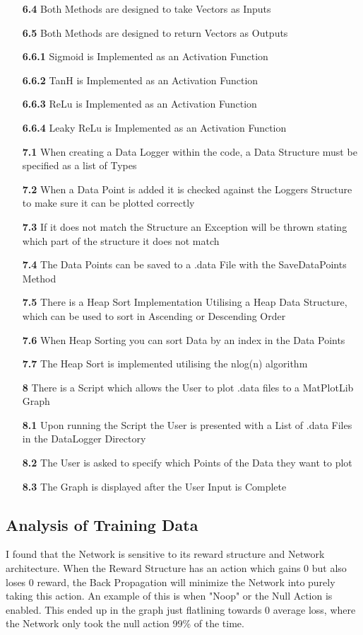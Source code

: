 \begin{flushleft}
\begin{itemize}
            \item[\textbf{6.4}] Both Methods are designed to take Vectors as Inputs
            \item[\textbf{6.5}] Both Methods are designed to return Vectors as Outputs
            \item[\textbf{6.6.1}] Sigmoid is Implemented as an Activation Function
            \item[\textbf{6.6.2}] TanH is Implemented as an Activation Function
            \item[\textbf{6.6.3}] ReLu is Implemented as an Activation Function
            \item[\textbf{6.6.4}] Leaky ReLu is Implemented as an Activation Function
            \item[\textbf{7.1}] When creating a Data Logger within the code, a Data Structure must be specified as a list of Types
            \item[\textbf{7.2}] When a Data Point is added it is checked against the Loggers Structure to make sure it can be plotted correctly
            \item[\textbf{7.3}] If it does not match the Structure an Exception will be thrown stating which part of the structure it does not match
            \item[\textbf{7.4}] The Data Points can be saved to a .data File with the \textsf{SaveDataPoints} Method
            \item[\textbf{7.5}] There is a Heap Sort Implementation Utilising a Heap Data Structure, which can be used to sort in Ascending or Descending Order
            \item[\textbf{7.6}] When Heap Sorting you can sort Data by an index in the Data Points
            \item[\textbf{7.7}] The Heap Sort is implemented utilising the nlog(n) algorithm
            \item[\textbf{8}] There is a Script which allows the User to plot .data files to a MatPlotLib Graph
            \item[\textbf{8.1}] Upon running the Script the User is presented with a List of .data Files in the DataLogger Directory
            \item[\textbf{8.2}] The User is asked to specify which Points of the Data they want to plot
            \item[\textbf{8.3}] The Graph is displayed after the User Input is Complete
        \end{itemize}
    \subsection{Analysis of Training Data}
        I found that the Network is sensitive to its reward structure and Network architecture. When the Reward Structure has an action which
        gains 0 but also loses 0 reward, the Back Propagation will minimize the Network into purely taking this action. An example of this
        is when "Noop" or the Null Action is enabled. This ended up in the graph just flatlining towards 0 average loss, where the Network
        only took the null action 99\% of the time. 


\end{flushleft}
